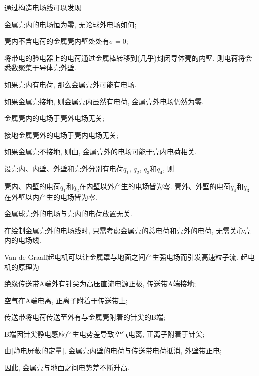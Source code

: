 \documentclass[../Electromagnetism.tex]{subfiles}
\begin{document}
通过构造电场线可以发现
\begin{finale}
	\begin{corollary}[金属壳内的电场]\quad
		\begin{cenum}
			\item 金属壳内的电场恒为零, 无论球外电场如何;
			\item 壳内不含电荷的金属壳内壁处处有$\sigma = 0$;
		\end{cenum}
	\end{corollary}
\end{finale}
\begin{ex}
	将带电的验电器上的电荷通过金属棒转移到(几乎)封闭导体壳的内壁, 则电荷将会悉数聚集于导体壳外壁.
\end{ex}
如果壳内有电荷, 那么金属壳外可能有电场.
\begin{ex}
	如果金属壳接地, 则金属壳内虽然有电荷, 金属壳外电场仍然为零.
\end{ex}
\begin{finale}
	\begin{corollary}[静电屏蔽]\quad
		\begin{cenum}
			\item 金属壳内的电场于壳外电场无关;
			\item 接地金属壳外的电场于壳内电场无关;
		\end{cenum}
	\end{corollary}
\end{finale}
\begin{ex}
	如果金属壳不接地, 则由, 金属壳外的电场可能于壳内电荷相关.
\end{ex}
\begin{corollary}[静电屏蔽的定量]
	\label{coll:静电屏蔽的定量}
	设壳内、内壁、外壁和壳外分别有电荷$q_1$, $q_2$, $q_3$和$q_4$, 则
	\begin{finale}
		壳内、内壁的电荷$q_1$和$q_2$在内壁以外产生的电场皆为零. 壳外、外壁的电荷$q_4$和$q_3$在外壁以内产生的电场皆为零. 
	\end{finale}
\end{corollary}
\begin{ex}
	金属球壳外的电场与壳内的电荷放置无关.
\end{ex}
\begin{remark}
	在绘制金属壳外的电场线时, 只需考虑金属壳的总电荷和壳外的电荷, 无需关心壳内的电场线.
\end{remark}
\begin{ex}
	Van de Graaff起电机可以让金属罩与地面之间产生强电场而引发高速粒子流. 起电机的原理为
	\begin{cenum}
		\item 绝缘传送带A端外有针尖为高压直流电源正极, 传送带A端接地;
		\item 空气在A端电离, 正离子附着于传送带上;
		\item 传送带将电荷传送至外有与金属壳附着的针尖的B端;
		\item B端因针尖静电感应产生电势差导致空气电离, 正离子附着于针尖;
		\item 由\cref{静电屏蔽的定量}, 金属壳内壁的电荷与传送带电荷抵消, 外壁带正电;
		\item 因此, 金属壳与地面之间电势差不断升高.
	\end{cenum}
\end{ex}
\end{document}
